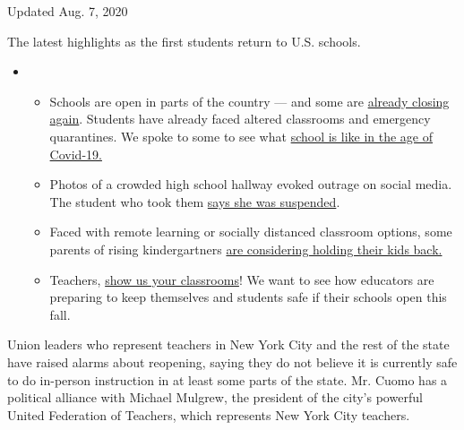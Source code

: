 Updated Aug. 7, 2020

The latest highlights as the first students return to U.S. schools.

\begin{itemize}
\item
  \begin{itemize}
  \tightlist
  \item
    Schools are open in parts of the country --- and some are
    \href{https://www.nytimes3xbfgragh.onion/2020/08/03/us/school-closing-coronavirus.html?action=click\&pgtype=Article\&state=default\&region=MAIN_CONTENT_2\&context=storylines_keepup}{already
    closing again}. Students have already faced altered classrooms and
    emergency quarantines. We spoke to some to see what
    \href{https://www.nytimes3xbfgragh.onion/2020/08/06/us/coronavirus-students.html?action=click\&pgtype=Article\&state=default\&region=MAIN_CONTENT_2\&context=storylines_keepup}{school
    is like in the age of Covid-19.}
  \item
    Photos of a crowded high school hallway evoked outrage on social
    media. The student who took them
    \href{https://www.nytimes3xbfgragh.onion/2020/08/06/us/north-paulding-high-school-coronavirus-georgia.html?action=click\&pgtype=Article\&state=default\&region=MAIN_CONTENT_2\&context=storylines_keepup}{says
    she was suspended}.
  \item
    Faced with remote learning or socially distanced classroom options,
    some parents of rising kindergartners
    \href{https://www.nytimes3xbfgragh.onion/2020/07/23/parenting/school-opening-kindergarten-coronavirus.html?action=click\&pgtype=Article\&state=default\&region=MAIN_CONTENT_2\&context=storylines_keepup}{are
    considering holding their kids back.}
  \item
    Teachers,
    \href{https://www.nytimes3xbfgragh.onion/2020/08/05/reader-center/teachers-show-us-how-the-coronavirus-is-changing-your-classroom.html?action=click\&pgtype=Article\&state=default\&region=MAIN_CONTENT_2\&context=storylines_keepup}{show
    us your classrooms}! We want to see how educators are preparing to
    keep themselves and students safe if their schools open this fall.
  \end{itemize}
\end{itemize}

Union leaders who represent teachers in New York City and the rest of
the state have raised alarms about reopening, saying they do not believe
it is currently safe to do in-person instruction in at least some parts
of the state. Mr. Cuomo has a political alliance with Michael Mulgrew,
the president of the city's powerful United Federation of Teachers,
which represents New York City teachers.

